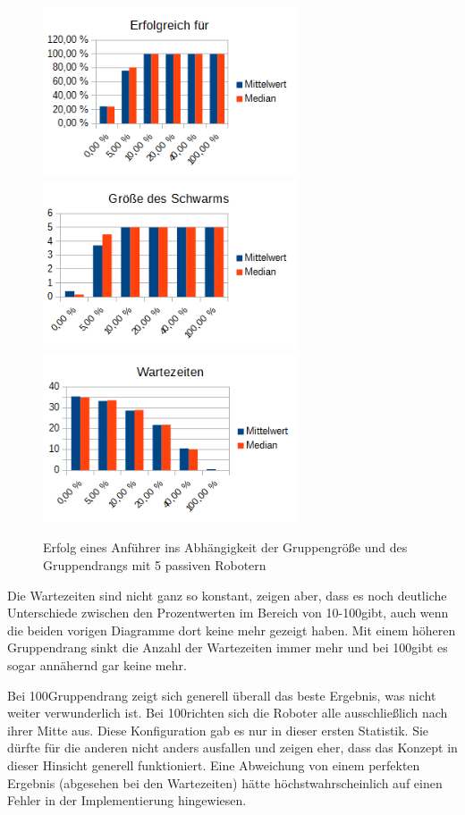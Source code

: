 \begin{figure}[h]
	\includegraphics[width=7.5cm, keepaspectratio]{graphics/Statistics/Leader/FlockSize/5_1.png}
	\includegraphics[width=7.5cm, keepaspectratio]{graphics/Statistics/Leader/FlockSize/5_2.png}
	\includegraphics[width=7.5cm, keepaspectratio]{graphics/Statistics/Leader/FlockSize/5_3.png}
	\caption{Erfolg eines Anführer ins Abhängigkeit der Gruppengröße und des Gruppendrangs mit 5 passiven Robotern}
	\label{pic:LeaderSize5}
\end{figure}

Die Wartezeiten sind nicht ganz so konstant, zeigen aber, dass es noch deutliche Unterschiede zwischen den Prozentwerten im Bereich von 10-100\per gibt, auch wenn die beiden vorigen Diagramme dort keine mehr gezeigt haben. Mit einem höheren Gruppendrang sinkt die Anzahl der Wartezeiten immer mehr und bei 100\per gibt es sogar annähernd gar keine mehr.

Bei 100\per Gruppendrang zeigt sich generell überall das beste Ergebnis, was nicht weiter verwunderlich ist. Bei 100\per richten sich die Roboter alle ausschließlich nach ihrer Mitte aus. Diese Konfiguration gab es nur in dieser ersten Statistik. Sie dürfte für die anderen nicht anders ausfallen und zeigen eher, dass das Konzept in dieser Hinsicht generell funktioniert. Eine Abweichung von einem perfekten Ergebnis (abgesehen bei den Wartezeiten) hätte höchstwahrscheinlich auf einen Fehler in der Implementierung hingewiesen.


